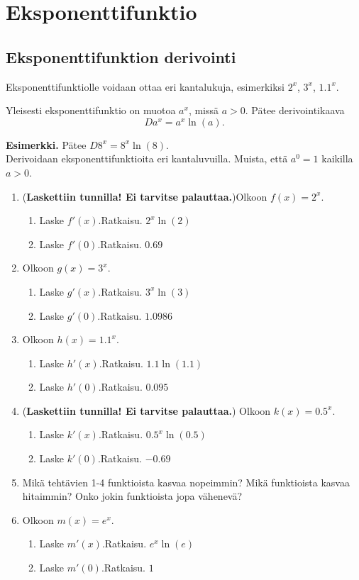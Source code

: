 \documentclass[10pt]{article}
\newcommand{\ratkaisu}[1]{\hfill{\color{blue}\quad\textrm{Ratkaisu. } #1}}
\begin{document}
\newpage

\section{Eksponenttifunktio}

\subsection{Eksponenttifunktion derivointi}

Eksponenttifunktiolle voidaan ottaa eri kantalukuja, esimerkiksi $2^x$, $3^x$, $1.1^x$. 

Yleisesti eksponenttifunktio on muotoa $a^x$, missä $a>0$. Pätee derivointikaava
$$
Da^x=a^x\ln(a).
$$

\textbf{Esimerkki.} Pätee $D8^x=8^x\ln(8)$.\\

Derivoidaan eksponenttifunktioita eri kantaluvuilla. Muista, että $a^0=1$ kaikilla $a>0$.
\begin{enumerate}
\item (\textbf{Laskettiin tunnilla! Ei tarvitse palauttaa.})Olkoon $f(x)=2^x$.
\begin{enumerate}
\item Laske $f'(x)$.\ratkaisu{$2^x\ln(2)$}
\item Laske $f'(0)$.\ratkaisu{$0.69$}
\end{enumerate}
\item Olkoon $g(x)=3^x$.
\begin{enumerate}
\item Laske $g'(x)$.\ratkaisu{$3^x\ln(3)$}
\item Laske $g'(0)$.\ratkaisu{$1.0986$}
\end{enumerate}
\item Olkoon $h(x)=1.1^x$.
\begin{enumerate}
\item Laske $h'(x)$.\ratkaisu{$1.1\ln(1.1)$}
\item Laske $h'(0)$.\ratkaisu{$0.095$}
\end{enumerate}
\item (\textbf{Laskettiin tunnilla! Ei tarvitse palauttaa.}) Olkoon $k(x)=0.5^x$.
\begin{enumerate}
\item Laske $k'(x)$.\ratkaisu{$0.5^x\ln(0.5)$}
\item Laske $k'(0)$.\ratkaisu{$-0.69$}
\end{enumerate}
\item Mikä tehtävien 1-4 funktioista kasvaa nopeimmin? Mikä funktioista kasvaa hitaimmin? Onko jokin funktioista jopa vähenevä?
\item Olkoon $m(x)=e^x$.
\begin{enumerate}
\item Laske $m'(x)$.\ratkaisu{$e^x\ln(e)$}
\item Laske $m'(0)$.\ratkaisu{$1$}
\end{enumerate}
\end{enumerate}
\end{document}
